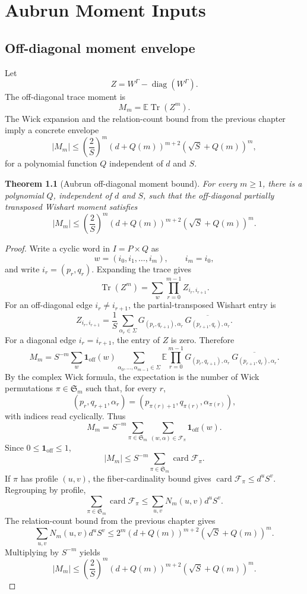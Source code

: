 \documentclass[11pt,oneside]{book}
\newtheorem{theorem}{Theorem}[chapter]
\DeclareMathOperator{\Tr}{Tr}
\DeclareMathOperator{\diag}{diag}
\DeclareMathOperator{\card}{card}
\newcommand{\E}{\mathbb E}
\newcommand{\1}{\mathbf 1}
\newcommand{\pt}{\Gamma}
\begin{document}
\chapter{Aubrun Moment Inputs}

\section{Off-diagonal moment envelope}

Let
\[
  Z=W^\pt-\diag(W^\pt).
\]
The off-diagonal trace moment is
\[
  M_m=\E\Tr(Z^m).
\]
The Wick expansion and the relation-count bound from the previous chapter
imply a concrete envelope
\[
  |M_m|
  \le
  \left(\frac2S\right)^m
  (d+Q(m))^{m+2}(\sqrt S+Q(m))^m,
\]
for a polynomial function \(Q\) independent of \(d\) and \(S\).

\begin{theorem}[Aubrun off-diagonal moment bound]
For every \(m\ge1\), there is a polynomial \(Q\), independent of \(d\) and
\(S\), such that the off-diagonal partially transposed Wishart moment satisfies
\[
  |M_m|
  \le
  \left(\frac2S\right)^m
  (d+Q(m))^{m+2}(\sqrt S+Q(m))^m.
\]
\end{theorem}

\begin{proof}
Write a cyclic word in \(I=P\times Q\) as
\[
  w=(i_0,i_1,\ldots,i_m),\qquad i_m=i_0,
\]
and write \(i_r=(p_r,q_r)\).  Expanding the trace gives
\[
  \Tr(Z^m)
  =
  \sum_w\prod_{r=0}^{m-1}Z_{i_r,i_{r+1}}.
\]
For an off-diagonal edge \(i_r\ne i_{r+1}\), the partial-transposed Wishart
entry is
\[
  Z_{i_r,i_{r+1}}
  =
  \frac1S
  \sum_{\alpha_r\in\Sigma}
  G_{(p_r,q_{r+1}),\alpha_r}\,
  \overline{G_{(p_{r+1},q_r),\alpha_r}}.
\]
For a diagonal edge \(i_r=i_{r+1}\), the entry of \(Z\) is zero.  Therefore
\[
  M_m
  =
  S^{-m}
  \sum_w\mathbf 1_{\mathrm{off}}(w)
  \sum_{\alpha_0,\ldots,\alpha_{m-1}\in\Sigma}
  \E\prod_{r=0}^{m-1}
  G_{(p_r,q_{r+1}),\alpha_r}\,
  \overline{G_{(p_{r+1},q_r),\alpha_r}}.
\]
By the complex Wick formula, the expectation is the number of Wick
permutations \(\pi\in\mathfrak S_m\) such that, for every \(r\),
\[
  (p_r,q_{r+1},\alpha_r)
  =
  (p_{\pi(r)+1},q_{\pi(r)},\alpha_{\pi(r)}),
\]
with indices read cyclically.  Thus
\[
  M_m
  =
  S^{-m}
  \sum_{\pi\in\mathfrak S_m}
  \sum_{(w,\alpha)\in\mathcal F_\pi}
  \mathbf 1_{\mathrm{off}}(w).
\]
Since \(0\le \mathbf 1_{\mathrm{off}}\le1\),
\[
  |M_m|
  \le
  S^{-m}\sum_{\pi\in\mathfrak S_m}\card\mathcal F_\pi.
\]
If \(\pi\) has profile \((u,v)\), the fiber-cardinality bound gives
\(\card\mathcal F_\pi\le d^uS^v\).  Regrouping by profile,
\[
  \sum_{\pi\in\mathfrak S_m}\card\mathcal F_\pi
  \le
  \sum_{u,v}N_m(u,v)d^uS^v.
\]
The relation-count bound from the previous chapter gives
\[
  \sum_{u,v}N_m(u,v)d^uS^v
  \le
  2^m(d+Q(m))^{m+2}(\sqrt S+Q(m))^m.
\]
Multiplying by \(S^{-m}\) yields
\[
  |M_m|
  \le
  \left(\frac2S\right)^m
  (d+Q(m))^{m+2}(\sqrt S+Q(m))^m.
\]
\end{proof}
\end{document}
